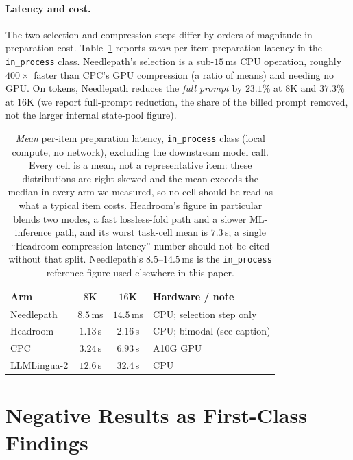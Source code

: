 \documentclass[11pt]{article}
\newcommand{\NP}{Needlepath}
\begin{document}
\paragraph{Latency and cost.} The two selection and compression steps differ by orders of
magnitude in preparation cost. Table~\ref{tab:ruler-latency} reports \emph{mean} per-item
preparation latency in the \texttt{in\_process} class. \NP{}'s selection is a sub-$15$\,ms CPU
operation, roughly $400\times$ faster than CPC's GPU compression (a ratio of means) and needing
no GPU. On tokens, \NP{} reduces the
\emph{full prompt} by $23.1\%$ at $8$K and $37.3\%$ at $16$K (we report full-prompt reduction,
the share of the billed prompt removed, not the larger internal state-pool figure).

\begin{table}[t]
\centering
\small
\begin{tabular}{@{}lccl@{}}
\toprule
Arm & $8$K & $16$K & Hardware / note \\
\midrule
\NP{}        & $8.5$\,ms & $14.5$\,ms & CPU; selection step only \\
Headroom     & $1.13$\,s & $2.16$\,s  & CPU; bimodal (see caption) \\
CPC          & $3.24$\,s & $6.93$\,s  & A10G GPU \\
LLMLingua-2  & $12.6$\,s & $32.4$\,s  & CPU \\
\bottomrule
\end{tabular}
\caption{\emph{Mean} per-item preparation latency, \texttt{in\_process} class (local compute, no
network), excluding the downstream model call. Every cell is a mean, not a representative item:
these distributions are right-skewed and the mean exceeds the median in every arm we measured, so
no cell should be read as what a typical item costs. Headroom's figure in particular blends two
modes, a fast lossless-fold path and a slower ML-inference path, and its worst task-cell mean is
$7.3$\,s; a single ``Headroom compression latency'' number should not be cited without that
split. \NP{}'s $8.5$--$14.5$\,ms is the \texttt{in\_process} reference figure used elsewhere in
this paper.}
\label{tab:ruler-latency}
\end{table}

\section{Negative Results as First-Class Findings}
\label{sec:negative}
\end{document}

